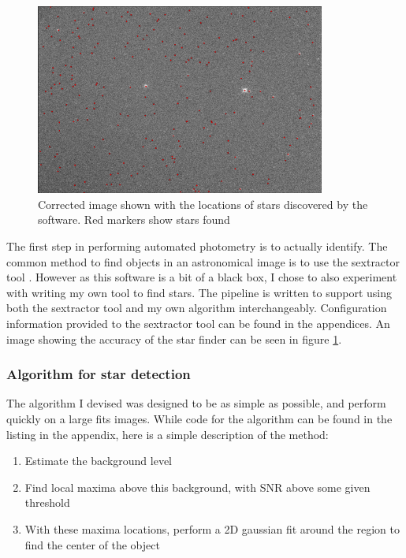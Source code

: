 \begin{figure}[ht]
    \centering
    \includegraphics[width=0.85\textwidth]{images/starfinder.png}
    \caption{Corrected image shown with the locations of stars discovered by the software. Red markers show stars found}
    \label{fig:finder_image}
\end{figure}

The first step in performing automated photometry is to actually identify. The common method to find objects in an astronomical image is to use the sextractor tool \citep{bertin1996sextractor}. However as this software is a bit of a black box, I chose to also experiment with writing my own tool to find stars. The pipeline is written to support using both the sextractor tool and my own algorithm interchangeably. Configuration information provided to the sextractor tool can be found in the appendices. An image showing the accuracy of the star finder can be seen in figure \ref{fig:finder_image}.

\subsubsection{Algorithm for star detection}

The algorithm I devised was designed to be as simple as possible, and perform quickly on a large fits images. While code for the algorithm can be found in the listing in the appendix, here is a simple description of the method:
\begin{enumerate}
    \item Estimate the background level
    \item Find local maxima above this background, with SNR above some given threshold
    \item With these maxima locations, perform a 2D gaussian fit around the region to find the center of the object
\end{enumerate}

